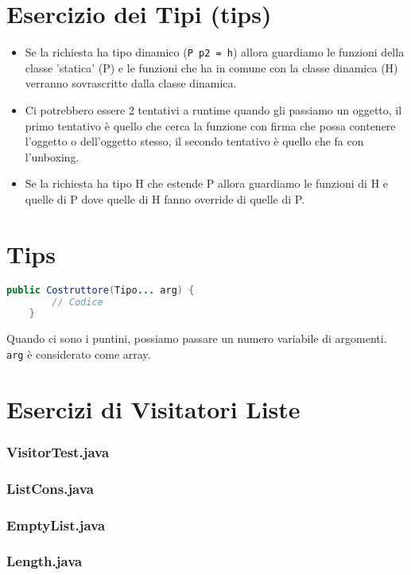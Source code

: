 \documentclass[10pt]{article}
\begin{document}
\section{Esercizio dei Tipi (tips)}
\begin{itemize}
    \item Se la richiesta ha tipo dinamico (\texttt{P p2 = h}) allora guardiamo le funzioni della classe 'statica' (P) e le funzioni che ha in comune con la classe dinamica (H) verranno sovrascritte dalla classe dinamica.
    \item Ci potrebbero essere 2 tentativi a runtime quando gli passiamo un oggetto, il primo tentativo è quello che cerca la funzione con firma che possa contenere l'oggetto o dell'oggetto stesso, il secondo tentativo è quello che fa con l'unboxing. 
    \item Se la richiesta ha tipo H che estende P allora guardiamo le funzioni di H e quelle di P dove quelle di H fanno override di quelle di P.
\end{itemize}
\section{Tips}
\begin{lstlisting}[language=Java]
    public Costruttore(Tipo... arg) {
        // Codice
    }
\end{lstlisting}
Quando ci sono i puntini, possiamo passare un numero variabile di argomenti. \texttt{arg} è considerato come array.
\section{Esercizi di Visitatori Liste}
        \subsubsection{VisitorTest.java}
            
        \subsubsection{ListCons.java}
            
        \subsubsection{EmptyList.java}
            
        \subsubsection{Length.java}
            
\end{document}
